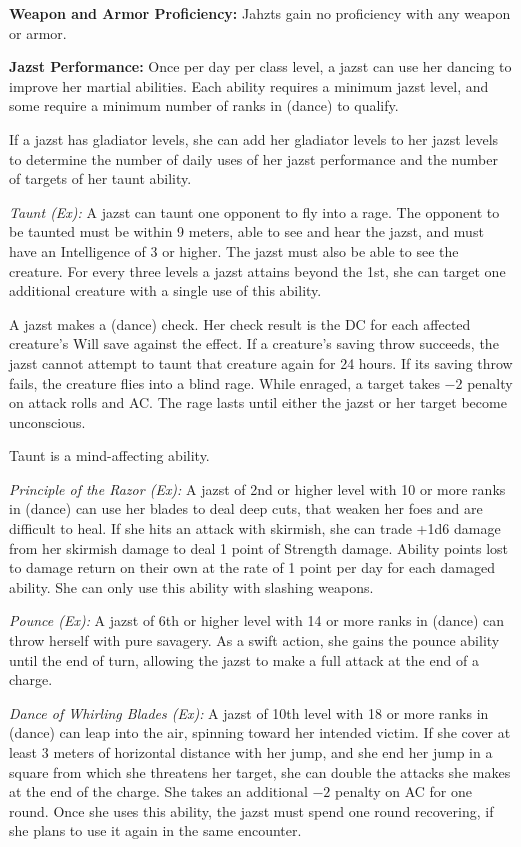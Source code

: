 {
\textbf{Weapon and Armor Proficiency:} Jahzts gain no proficiency with any weapon or armor.

\textbf{Jazst Performance:} Once per day per class level, a jazst can use her dancing to improve her martial abilities. Each ability requires a minimum jazst level, and some require a minimum number of ranks in  (dance) to qualify.

If a jazst has gladiator levels, she can add her gladiator levels to her jazst levels to determine the number of daily uses of her jazst performance and the number of targets of her taunt ability.

\textit{Taunt (Ex):} A jazst can taunt one opponent to fly into a rage. The opponent to be taunted must be within 9 meters, able to see and hear the jazst, and must have an Intelligence of 3 or higher. The jazst must also be able to see the creature. For every three levels a jazst attains beyond the 1st, she can target one additional creature with a single use of this ability.

A jazst makes a  (dance) check. Her check result is the DC for each affected creature's Will save against the effect. If a creature's saving throw succeeds, the jazst cannot attempt to taunt that creature again for 24 hours. If its saving throw fails, the creature flies into a blind rage. While enraged, a target takes $-2$ penalty on attack rolls and AC. The rage lasts until either the jazst or her target become unconscious.

Taunt is a mind-affecting ability.

\textit{Principle of the Razor (Ex):} A jazst of 2nd or higher level with 10 or more ranks in  (dance) can use her blades to deal deep cuts, that weaken her foes and are difficult to heal. If she hits an attack with skirmish, she can trade +1d6 damage from her skirmish damage to deal 1 point of Strength damage. Ability points lost to damage return on their own at the rate of 1 point per day for each damaged ability. She can only use this ability with slashing weapons.

\textit{Pounce (Ex):} A jazst of 6th or higher level with 14 or more ranks in  (dance) can throw herself with pure savagery. As a swift action, she gains the pounce ability until the end of turn, allowing the jazst to make a full attack at the end of a charge.

\textit{Dance of Whirling Blades (Ex):} A jazst of 10th level with 18 or more ranks in  (dance) can leap into the air, spinning toward her intended victim. If she cover at least 3 meters of horizontal distance with her jump, and she end her jump in a square from which she threatens her target, she can double the attacks she makes at the end of the charge. She takes an additional $-2$ penalty on AC for one round. Once she uses this ability, the jazst must spend one round recovering, if she plans to use it again in the same encounter.

}

